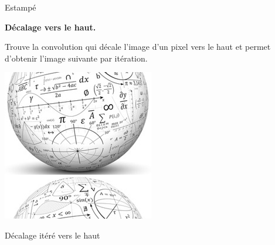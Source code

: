 \documentclass[11pt,class=report,crop=false]{standalone}
\begin{document}
\begin{activite}
\begin{center}
\begin{minipage}{0.45\textwidth}
		Estampé
	\end{minipage}	
\end{center}



\bigskip

\textbf{Décalage vers le haut.}

Trouve la convolution qui décale l'image d'un pixel vers le haut et permet d'obtenir l'image suivante par itération.
\begin{center}
		\includegraphics[scale=\myscale,scale=0.55]{png/monde_conv_decal}
		
		Décalage itéré vers le haut
\end{center}
		
\end{activite}

\end{document}
